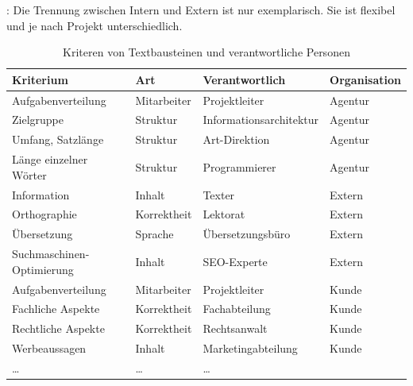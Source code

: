 \TODO : Die Trennung zwischen Intern und Extern ist nur exemplarisch. Sie ist flexibel und je nach Projekt unterschiedlich.

\begin{table}
\begin{center}
\begin{tabular}{@{}l l l l}
\textbf{Kriterium} & \textbf{Art} & \textbf{Verantwortlich} & \textbf{Organisation}\\
\hline
Aufgabenverteilung & Mitarbeiter & Projektleiter & Agentur\\
\hline
Zielgruppe & Struktur & Informationsarchitektur & Agentur\\
\hline
Umfang, Satzlänge & Struktur & Art-Direktion & Agentur\\
\hline
Länge einzelner Wörter & Struktur & Programmierer & Agentur\\
\hline
Information & Inhalt & Texter & Extern\\
\hline
Orthographie & Korrektheit & Lektorat & Extern\\
\hline
Übersetzung & Sprache & Übersetzungsbüro & Extern\\
\hline
Suchmaschinen-Optimierung & Inhalt & SEO-Experte & Extern\\
\hline
Aufgabenverteilung & Mitarbeiter & Projektleiter & Kunde\\
\hline
Fachliche Aspekte & Korrektheit & Fachabteilung & Kunde\\
\hline
Rechtliche Aspekte & Korrektheit & Rechtsanwalt & Kunde\\
\hline
Werbeaussagen & Inhalt & Marketingabteilung & Kunde\\
\hline
… & … & …
\end{tabular}
\caption{Kriteren von Textbausteinen und verantwortliche Personen}
\label{table:textkriterien}
\end{center}
\end{table}

